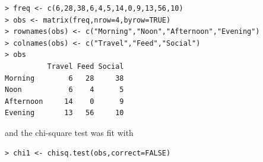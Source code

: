 \documentclass[10pt,openany]{book}\usepackage[]{graphicx}\usepackage[]{color}
\makeatletter
\newenvironment{kframe}{%
 \def\at@end@of@kframe{}%
 \ifinner\ifhmode%
  \def\at@end@of@kframe{\end{minipage}}%
  \begin{minipage}{\columnwidth}%
 \fi\fi%
 \def\FrameCommand##1{\hskip\@totalleftmargin \hskip-\fboxsep
 \colorbox{shadecolor}{##1}\hskip-\fboxsep
     \hskip-\linewidth \hskip-\@totalleftmargin \hskip\columnwidth}%
 \MakeFramed {\advance\hsize-\width
   \@totalleftmargin\z@ \linewidth\hsize
   \@setminipage}}%
 {\par\unskip\endMakeFramed%
 \at@end@of@kframe}
\newenvironment{knitrout}{}{} %
\makeatother
\begin{document}
\begin{itemize}
\begin{enumerate}
\begin{knitrout}
\begin{kframe}
\begin{verbatim}
> freq <- c(6,28,38,6,4,5,14,0,9,13,56,10)
> obs <- matrix(freq,nrow=4,byrow=TRUE)
> rownames(obs) <- c("Morning","Noon","Afternoon","Evening")
> colnames(obs) <- c("Travel","Feed","Social")
> obs
          Travel Feed Social
Morning        6   28     38
Noon           6    4      5
Afternoon     14    0      9
Evening       13   56     10
\end{verbatim}
\end{kframe}
\end{knitrout}
and the chi-square test was fit with
\begin{knitrout}
\color{fgcolor}\begin{kframe}
\begin{verbatim}
> chi1 <- chisq.test(obs,correct=FALSE)
\end{verbatim}



\end{kframe}
\end{knitrout}
\end{enumerate}
\end{itemize}
\end{document}
